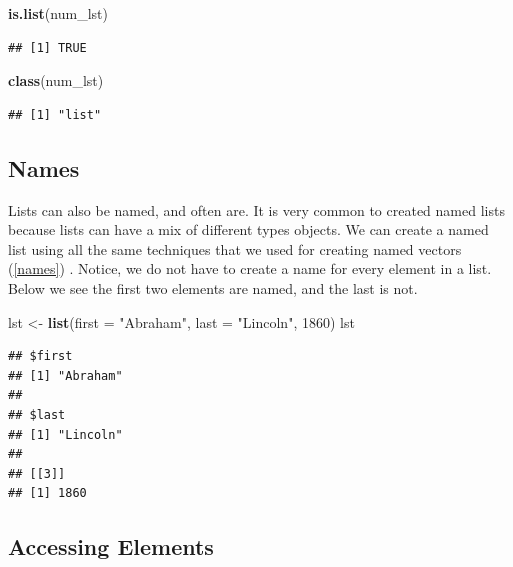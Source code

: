 \documentclass[
]{book}
\newenvironment{Shaded}{\begin{snugshade}}{\end{snugshade}}
\newcommand{\DataTypeTok}[1]{\textcolor[rgb]{0.13,0.29,0.53}{#1}}
\newcommand{\DecValTok}[1]{\textcolor[rgb]{0.00,0.00,0.81}{#1}}
\newcommand{\KeywordTok}[1]{\textcolor[rgb]{0.13,0.29,0.53}{\textbf{#1}}}
\newcommand{\NormalTok}[1]{#1}
\newcommand{\StringTok}[1]{\textcolor[rgb]{0.31,0.60,0.02}{#1}}
\begin{document}
\begin{Shaded}
\begin{Highlighting}[]
\KeywordTok{is.list}\NormalTok{(num_lst)}
\end{Highlighting}
\end{Shaded}

\begin{verbatim}
## [1] TRUE
\end{verbatim}

\begin{Shaded}
\begin{Highlighting}[]
\KeywordTok{class}\NormalTok{(num_lst)}
\end{Highlighting}
\end{Shaded}

\begin{verbatim}
## [1] "list"
\end{verbatim}

\hypertarget{names-2}{%
\subsection{Names}\label{names-2}}

Lists can also be named, and often are. It is very common to created named lists because lists can have a mix of different types objects. We can create a named list using all the same techniques that we used for creating named vectors (\ref{names}) . Notice, we do not have to create a name for every element in a list. Below we see the first two elements are named, and the last is not.

\begin{Shaded}
\begin{Highlighting}[]
\NormalTok{lst <-}\StringTok{ }\KeywordTok{list}\NormalTok{(}\DataTypeTok{first =} \StringTok{"Abraham"}\NormalTok{, }\DataTypeTok{last =} \StringTok{"Lincoln"}\NormalTok{, }\DecValTok{1860}\NormalTok{)}
\NormalTok{lst}
\end{Highlighting}
\end{Shaded}

\begin{verbatim}
## $first
## [1] "Abraham"
## 
## $last
## [1] "Lincoln"
## 
## [[3]]
## [1] 1860
\end{verbatim}

\hypertarget{accessing-elements-1}{%
\subsection{Accessing Elements}\label{accessing-elements-1}}
\end{document}

